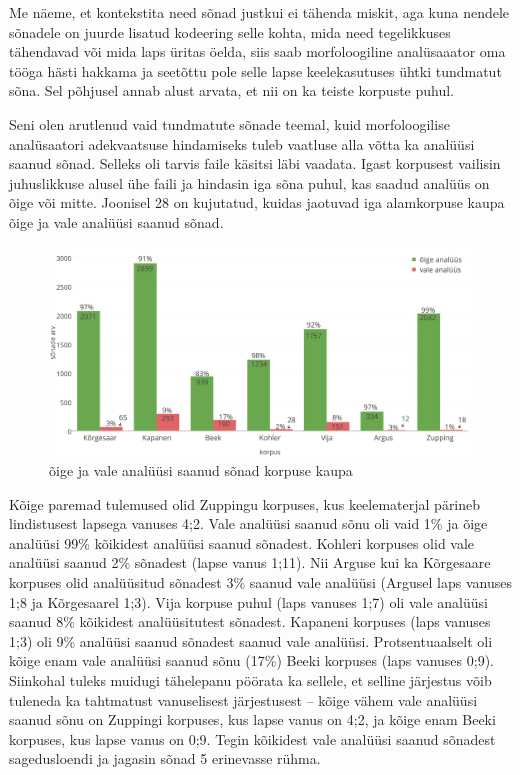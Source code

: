 \documentclass[12pt]{article}
\begin{document}
Me näeme, et kontekstita need sõnad justkui ei tähenda miskit, aga kuna nendele sõnadele on juurde lisatud kodeering selle kohta, mida need tegelikkuses tähendavad või mida laps üritas öelda, siis saab morfoloogiline analüsaaator oma tööga hästi hakkama ja seetõttu pole selle lapse keelekasutuses ühtki tundmatut sõna. Sel põhjusel annab alust arvata, et nii on ka teiste korpuste puhul.

Seni olen arutlenud vaid tundmatute sõnade teemal, kuid morfoloogilise analüsaatori adekvaatsuse hindamiseks tuleb vaatluse alla võtta ka analüüsi saanud sõnad. Selleks oli tarvis faile käsitsi läbi vaadata. Igast korpusest vailisin juhuslikkuse alusel ühe faili ja hindasin iga sõna puhul, kas saadud analüüs on õige või mitte. Joonisel 28 on kujutatud, kuidas jaotuvad iga alamkorpuse kaupa õige ja vale analüüsi saanud sõnad.
\hfill


\begin{figure}[H]
    \centering
    \includegraphics[width=\textwidth]{kasitsi_valed_oiged_crop}
    \caption{õige ja vale analüüsi saanud sõnad korpuse kaupa}
\end{figure}

Kõige paremad tulemused olid Zuppingu korpuses, kus keelematerjal pärineb lindistusest lapsega vanuses 4;2. Vale analüüsi saanud sõnu oli vaid 1\% ja õige analüüsi 99\% kõikidest analüüsi saanud sõnadest. Kohleri korpuses olid vale analüüsi saanud 2\% sõnadest (lapse vanus 1;11). Nii Arguse kui ka Kõrgesaare korpuses olid analüüsitud sõnadest 3\% saanud vale analüüsi (Argusel laps vanuses 1;8 ja Kõrgesaarel 1;3). Vija korpuse puhul (laps vanuses 1;7) oli vale analüüsi saanud 8\% kõikidest analüüsitutest sõnadest. Kapaneni korpuses (laps vanuses 1;3) oli 9\% analüüsi saanud sõnadest saanud vale analüüsi. Protsentuaalselt oli kõige enam vale analüüsi saanud sõnu (17\%) Beeki korpuses (laps vanuses 0;9). Siinkohal tuleks muidugi tähelepanu pöörata ka sellele, et selline järjestus võib tuleneda ka tahtmatust vanuselisest järjestusest -- kõige vähem vale analüüsi saanud sõnu on Zuppingi korpuses, kus lapse vanus on 4;2, ja kõige enam Beeki korpuses, kus lapse vanus on 0;9. Tegin kõikidest vale analüüsi saanud sõnadest sagedusloendi ja jagasin sõnad 5 erinevasse rühma.
\end{document}
